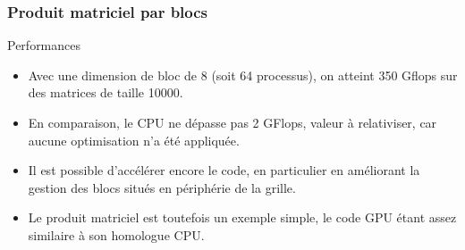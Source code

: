 \begin{frame}
    \frametitle{Produit matriciel par blocs}
\begin{block}{Performances}
 \begin{itemize}
    \item<+-> Avec une dimension de bloc de 8 (soit 64 processus), on atteint 350 Gflops sur des
    matrices de taille 10000.
    \item<+-> En comparaison, le CPU ne dépasse pas 2 GFlops, valeur à relativiser, car aucune optimisation n'a
    été appliquée.
    \item<+-> Il est possible d'accélérer encore le code, en particulier en améliorant la gestion des blocs
    situés en périphérie de la grille.
    \item<+-> Le produit matriciel est toutefois un exemple simple, le code GPU étant assez similaire à son 
    homologue CPU.
 \end{itemize} 
\end{block}
\end{frame}